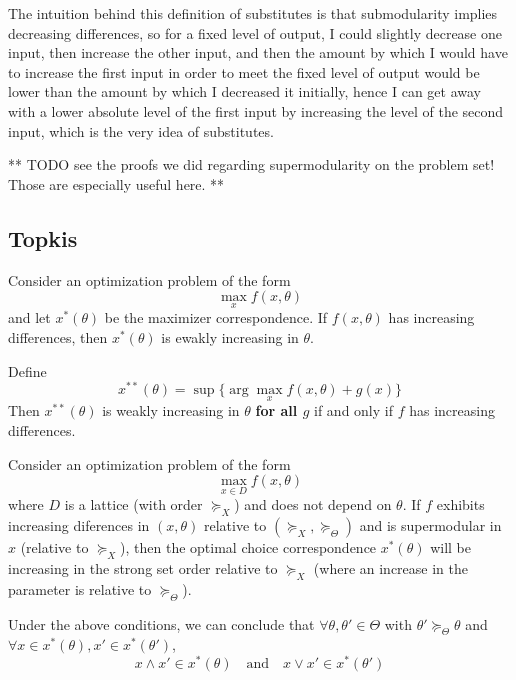 The intuition behind this definition of substitutes is that
submodularity implies decreasing differences, so for a fixed level of
output, I could slightly decrease one input, then increase the other
input, and then the amount by which I would have to increase the first
input in order to meet the fixed level of output would be lower than
the amount by which I decreased it initially, hence I can get away
with a lower absolute level of the first input by increasing the level
of the second input, which is the very idea of substitutes.


** TODO see the proofs we did regarding supermodularity on the problem
set! Those are especially useful here. **

\subsection{Topkis}
\label{sec:topkis}

\begin{theorem}
  Consider an optimization problem of the form
  \[
  \max_{x} f(x, \theta)
  \]
  and let $x^*(\theta)$ be the maximizer correspondence. If $f(x,
  \theta)$ has increasing differences, then $x^*(\theta)$ is ewakly
  increasing in $\theta$.
\end{theorem}

\begin{prop}
  Define
  \[
  x^{**}(\theta) = \sup\{ \arg \max_x f(x,\theta) + g(x) \}
  \]
  Then $x^{**}(\theta)$ is weakly increasing in $\theta$ \textbf{for
    all $g$} if and only if $f$ has increasing differences.
\end{prop}

\begin{theorem}[Topkis]
  Consider an optimization problem of the form
  \[
  \max_{x \in D} f(x, \theta)
  \]
  where $D$ is a lattice (with order $\succeq_X$) and does not depend
  on $\theta$. If $f$ exhibits increasing diferences in $(x,\theta)$
  relative to $(\succeq_X, \succeq_\Theta)$ and is supermodular in $x$
  (relative to $\succeq_X$), then the optimal choice correspondence
  $x^*(\theta)$ will be increasing in the strong set order relative to
  $\succeq_X$ (where an increase in the parameter is relative to
  $\succeq_\Theta$).

  Under the above conditions, we can conclude that $\forall \theta,
  \theta' \in \Theta$ with $\theta' \succeq_\Theta \theta$ and
  $\forall x \in x^*(\theta), x' \in x^*(\theta')$,
  \[
  x \wedge x' \in x^*(\theta) \quad \text{and} \quad x \vee x' \in x^*(\theta')
  \]
\end{theorem}


